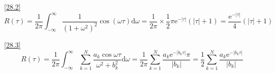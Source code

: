 \documentclass[boxes]{homework}
\begin{document}
\begin{solution}
    \ref{28.2}
    \begin{equation}
        R(\tau) = \frac{1}{2\pi}\int_{-\infty}^\infty \frac{1}{(1 + \omega^2)^2}\cos(\omega\tau)\mathrm{d}\omega
        = \frac{1}{2\pi}\times\frac{1}{2}\pi \mathrm{e}^{-|\tau|}(|\tau|+1) = \frac{\mathrm{e}^{-|\tau|}}{4}(|\tau|+1)
    \end{equation}

    \ref{28.3}
    \begin{equation}
        R(\tau) = \frac{1}{2\pi}\int_{-\infty}^\infty \sum_{k = 1}^N \frac{a_k\cos \omega\tau}{\omega^2 + b_k^2}\mathrm{d}\omega
        = \frac{1}{2\pi}\sum_{k = 1}^N\frac{a_k\mathrm{e}^{-|b_k\tau|}\pi}{|b_k|} = \frac{1}{2} \sum_{k = 1}^N\frac{a_k\mathrm{e}^{-|b_k\tau|}}{|b_k|}
    \end{equation}
\end{solution}
\end{document}
